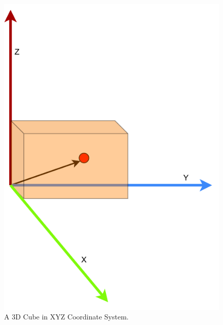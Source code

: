 \begin{figure}[htbp]
    \centering
    \includegraphics[width=0.4\linewidth]{97_graphics/related_work/scalar_and_vector.pdf}
    \caption{A 3D Cube in XYZ Coordinate System.}
    \label{fig:related_work-scalar_and_vector}
\end{figure}

